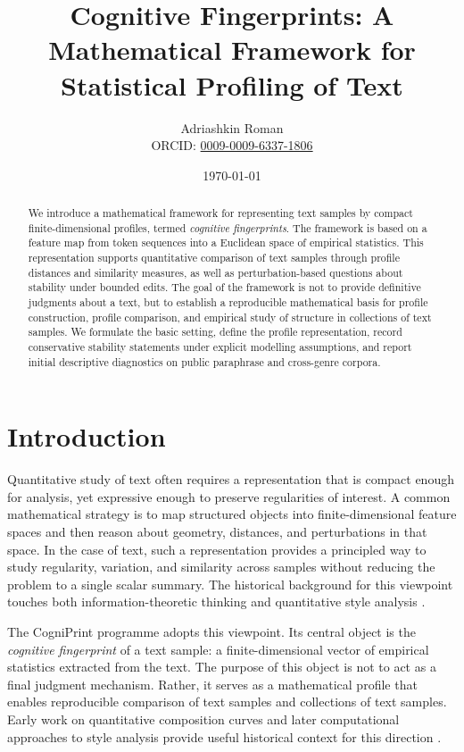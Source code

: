 \documentclass[11pt]{article}
\title{Cognitive Fingerprints: A Mathematical Framework for Statistical Profiling of Text}
\author{Adriashkin Roman\\\small ORCID: \href{https://orcid.org/0009-0009-6337-1806}{0009-0009-6337-1806}}
\date{\today}
\begin{document}
\maketitle

\begin{abstract}
We introduce a mathematical framework for representing text samples by compact finite-dimensional profiles, termed \emph{cognitive fingerprints}. The framework is based on a feature map from token sequences into a Euclidean space of empirical statistics. This representation supports quantitative comparison of text samples through profile distances and similarity measures, as well as perturbation-based questions about stability under bounded edits. The goal of the framework is not to provide definitive judgments about a text, but to establish a reproducible mathematical basis for profile construction, profile comparison, and empirical study of structure in collections of text samples. We formulate the basic setting, define the profile representation, record conservative stability statements under explicit modelling assumptions, and report initial descriptive diagnostics on public paraphrase and cross-genre corpora.
\end{abstract}

\section{Introduction}

Quantitative study of text often requires a representation that is compact enough for analysis, yet expressive enough to preserve regularities of interest. A common mathematical strategy is to map structured objects into finite-dimensional feature spaces and then reason about geometry, distances, and perturbations in that space. In the case of text, such a representation provides a principled way to study regularity, variation, and similarity across samples without reducing the problem to a single scalar summary. The historical background for this viewpoint touches both information-theoretic thinking and quantitative style analysis \cite{Shannon1948,Holmes1998}.

The CogniPrint programme adopts this viewpoint. Its central object is the \emph{cognitive fingerprint} of a text sample: a finite-dimensional vector of empirical statistics extracted from the text. The purpose of this object is not to act as a final judgment mechanism. Rather, it serves as a mathematical profile that enables reproducible comparison of text samples and collections of text samples. Early work on quantitative composition curves and later computational approaches to style analysis provide useful historical context for this direction \cite{Mendenhall1887,Burrows1987,EderEtAl2016}.
\end{document}
